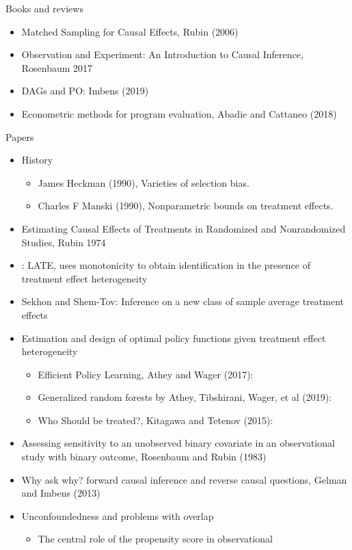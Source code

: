 \documentclass[12pt]{article}
\theoremstyle{plain}
\theoremstyle{definition}
\theoremstyle{remark}
\begin{document}
Books and reviews
\begin{itemize}
  \item Matched Sampling for Causal Effects, Rubin (2006)
  \item Observation and Experiment: An Introduction to Causal Inference, Rosenbaum 2017
  \item DAGs and PO: Imbens (2019)
  \item Econometric methods for program evaluation, Abadie and Cattaneo
    (2018)
\end{itemize}
Papers
\begin{itemize}
  \item History
    \begin{itemize}
      \item James Heckman (1990), Varieties of selection bias.
      \item Charles F Manski (1990), Nonparametric bounds on treatment effects.
    \end{itemize}
  \item Estimating Causal Effects of Treatments in Randomized and
    Nonrandomized Studies, Rubin 1974
  \item \cite{imbensangrist1994LATE}:
    LATE, uses monotonicity to obtain identification in the presence of treatment effect heterogeneity
  \item Sekhon and Shem-Tov: Inference on a new class of sample average
    treatment effects
  \item Estimation and design of optimal policy functions given
    treatment effect heterogeneity
    \begin{itemize}
      \item  Efficient Policy Learning, Athey and Wager (2017):
      \item Generalized random forests by Athey, Tibshirani, Wager, et
        al (2019):
      \item Who Should be treated?, Kitagawa and Tetenov (2015):
    \end{itemize}
  \item
    Assessing sensitivity to an unobserved binary covariate
    in an observational study with binary outcome,
    Rosenbaum and Rubin (1983)
  \item Why ask why? forward causal inference and reverse causal
    questions, Gelman and Imbens (2013)
  \item Unconfoundedness and problems with overlap
    \begin{itemize}
      \item The central role of the propensity score in observational

\end{itemize}
\end{itemize}
\end{document}
